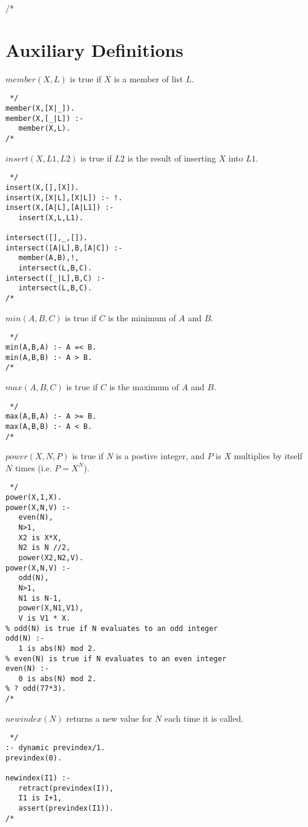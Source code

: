  /* 
\section{Auxiliary Definitions}

$member(X,L)$ is true if $X$ is a member of list $L$.
\begin{verbatim} */
member(X,[X|_]).
member(X,[_|L]) :-
   member(X,L).
/* \end{verbatim}

$insert(X,L1,L2)$ is true if $L2$ is the result of inserting $X$ into $L1$.
\begin{verbatim} */
insert(X,[],[X]).
insert(X,[X|L],[X|L]) :- !.
insert(X,[A|L],[A|L1]) :-
   insert(X,L,L1).

intersect([],_,[]).
intersect([A|L],B,[A|C]) :-
   member(A,B),!,
   intersect(L,B,C).
intersect([_|L],B,C) :-
   intersect(L,B,C).
/* \end{verbatim}

$min(A,B,C)$ is true if $C$ is the minimum of $A$ and $B$.
\begin{verbatim} */
min(A,B,A) :- A =< B.
min(A,B,B) :- A > B.
/* \end{verbatim}

$max(A,B,C)$ is true if $C$ is the maximum of $A$ and $B$.
\begin{verbatim} */
max(A,B,A) :- A >= B.
max(A,B,B) :- A < B.
/* \end{verbatim}

$power(X,N,P)$ is true if $N$ is a postive integer, and $P$ is $X$ multiplies by itself $N$ times (i.e. $P=X^N$).
\begin{verbatim} */
power(X,1,X).
power(X,N,V) :- 
   even(N),
   N>1,
   X2 is X*X,
   N2 is N //2,
   power(X2,N2,V).
power(X,N,V) :-
   odd(N),
   N>1,
   N1 is N-1,
   power(X,N1,V1),
   V is V1 * X.
% odd(N) is true if N evaluates to an odd integer
odd(N) :-
   1 is abs(N) mod 2.
% even(N) is true if N evaluates to an even integer
even(N) :-
   0 is abs(N) mod 2.
% ? odd(77*3).
/* \end{verbatim}

$newindex(N)$ returns a new value for $N$ each time it is called.
\begin{verbatim} */
:- dynamic previndex/1.
previndex(0).

newindex(I1) :-
   retract(previndex(I)),
   I1 is I+1,
   assert(previndex(I1)).
/* \end{verbatim}

